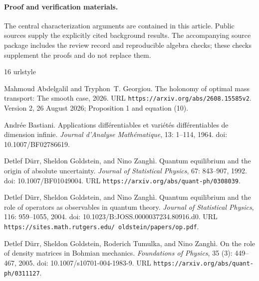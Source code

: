 \documentclass[11pt]{article}
\numberwithin{equation}{section}
\theoremstyle{definition}
\begin{document}
\paragraph{Proof and verification materials.} The central characterization arguments are contained in this article. Public sources supply the explicitly cited background results. The accompanying source package includes the review record and reproducible algebra checks; these checks supplement the proofs and do not replace them.
\nocite{PortfolioControl,PortfolioReturn,PortfolioEquilibrium,PortfolioPilot,PortfolioRecords,OriginalMonograph,OriginalPilot,OriginalMassive}
\begin{thebibliography}{16}
\providecommand{\natexlab}[1]{#1}
\providecommand{\url}[1]{\texttt{#1}}
\expandafter\ifx\csname urlstyle\endcsname\relax
  \providecommand{\doi}[1]{doi: #1}\else
  \providecommand{\doi}{doi: \begingroup \urlstyle{rm}\Url}\fi

Mahmoud Abdelgalil and Tryphon~T. Georgiou.
\newblock The holonomy of optimal mass transport: The smooth case, 2026.
\newblock URL \url{https://arxiv.org/abs/2608.15585v2}.
\newblock Version 2, 26 August 2026; Proposition 1 and equation (10).

Andr{\'e}e Bastiani.
\newblock Applications diff{\'e}rentiables et vari{\'e}t{\'e}s
  diff{\'e}rentiables de dimension infinie.
\newblock \emph{Journal d'Analyse Math{\'e}matique}, 13: 1--114, 1964.
\newblock \doi{10.1007/BF02786619}.

Detlef D{\"u}rr, Sheldon Goldstein, and Nino Zangh{\`i}.
\newblock Quantum equilibrium and the origin of absolute uncertainty.
\newblock \emph{Journal of Statistical Physics}, 67: 843--907, 1992.
\newblock \doi{10.1007/BF01049004}.
\newblock URL \url{https://arxiv.org/abs/quant-ph/0308039}.

Detlef D{\"u}rr, Sheldon Goldstein, and Nino Zangh{\`i}.
\newblock Quantum equilibrium and the role of operators as observables in
  quantum theory.
\newblock \emph{Journal of Statistical Physics}, 116: 959--1055, 2004.
\newblock \doi{10.1023/B:JOSS.0000037234.80916.d0}.
\newblock URL \url{https://sites.math.rutgers.edu/~oldstein/papers/op.pdf}.

Detlef D{\"u}rr, Sheldon Goldstein, Roderich Tumulka, and Nino Zangh{\`i}.
\newblock On the role of density matrices in {Bohmian} mechanics.
\newblock \emph{Foundations of Physics}, 35 (3): 449--467,
  2005.
\newblock \doi{10.1007/s10701-004-1983-9}.
\newblock URL \url{https://arxiv.org/abs/quant-ph/0311127}.


\end{thebibliography}
\end{document}
